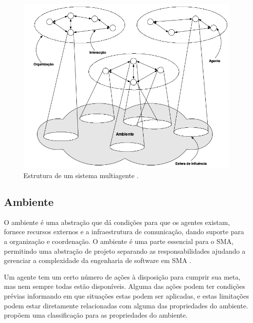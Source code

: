 \begin{figure}[ht]
\centering
\includegraphics[scale=0.4]{imagens/sma_org.png}
\caption{Estrutura de um sistema multiagente \cite{jennings2000agent}.}
\label{fig:sma_org}
\end{figure}

\subsection{Ambiente}

O ambiente é uma abstração que dá condições para que os agentes existam, fornece recursos externos e a infraestrutura de comunicação, dando suporte para a organização e coordenação. O ambiente é uma parte essencial para o SMA, permitindo uma abstração de projeto separando as responsabilidades ajudando a gerenciar a complexidade da engenharia de software em SMA \cite{weyns2007environment}.
  
Um agente tem um certo número de ações à disposição para cumprir sua meta, mas nem sempre todas estão disponíveis. Alguma das ações podem ter condições prévias informando em que situações estas podem ser aplicadas, e estas limitações podem estar diretamente relacionadas com alguma das propriedades do ambiente. \citet{russell2002artificial} propõem uma classificação para as propriedades do ambiente.
  
